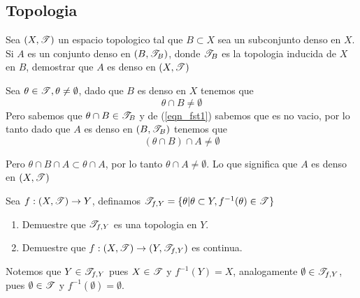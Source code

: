 \documentclass[../main.tex]{subfiles}
\begin{document}
\subsection{Topologia}
\begin{problem}
  Sea $(X, \mathscr{T})$ un espacio topologico tal que $B \subset X$ sea un subconjunto denso en $X$. Si
  $A$ es un conjunto denso en $(B, \mathscr{T}_{B})$, donde $\mathscr{T}_{B}$ es la topologia inducida de $X$ en $B$, demostrar que $A$ es denso en $(X, \mathscr{T})$
\end{problem}
\begin{solution}
  Sea $\theta \in \mathscr{T}, \theta \neq \emptyset$, dado que $B$ es denso en $X$ tenemos que
  \begin{equation}
    \label{eqn_fst1}
    \theta \cap B \neq \emptyset
  \end{equation}
  Pero sabemos que $\theta \cap B \in \mathscr{T}_{B}$ y de (\ref{eqn_fst1}) sabemos que es no vacio, por lo tanto dado que $A$ es denso en $(B, \mathscr{T}_{B})$ tenemos que
  \begin{equation*}
    (\theta \cap B) \cap A \neq \emptyset
  \end{equation*}

  Pero $\theta \cap B \cap A \subset \theta \cap A$, por lo tanto $\theta \cap A \neq \emptyset$.
  Lo que significa que $A$ es denso en $(X, \mathscr{T})$
\end{solution}

\begin{problem}
  Sea $f : (X, \mathscr{T}) \to Y$, definamos $\mathscr{T}_{f, Y} = \{\theta | \theta \subset Y, f^{-1}(\theta) \in \mathscr{T}\}$
  \begin{enumerate}
    \item Demuestre que $\mathscr{T}_{f, Y}$ es una topologia en $Y$.
    \item Demuestre que $f: (X, \mathscr{T}) \to (Y, \mathscr{T}_{f, Y})$ es continua.
  \end{enumerate}
\end{problem}
\begin{solution}
  Notemos que $Y \in \mathscr{T}_{f, Y}$ pues $X \in \mathscr{T}$ y $f^{-1}(Y) = X$, analogamente $\emptyset \in \mathscr{T}_{f, Y}$, pues $\emptyset \in \mathscr{T}$ y $f^{-1}(\emptyset) = \emptyset$.
\end{solution}
\end{document}
